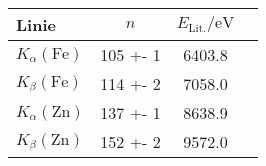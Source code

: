 \begin{tabular}{lSSS}
\toprule

{Linie} & {$n$} & {$E_\mathrm{Lit.} / \si{\electronvolt}$ \cite{booklet}}\\

\midrule

$K_\alpha(\mathrm{Fe})$ & 105 +- 1 & 6403.8 \\
$K_\beta(\mathrm{Fe})$ & 114 +- 2 & 7058.0 \\
$K_\alpha(\mathrm{Zn})$ & 137 +- 1 & 8638.9 \\
$K_\beta(\mathrm{Zn})$ & 152 +- 2 & 9572.0 \\

\bottomrule
\end{tabular}